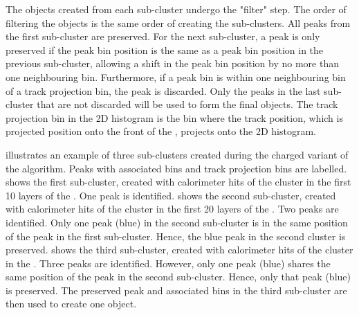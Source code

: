 The \ShowerPeak objects created from each sub-cluster undergo the "\ShowerPeak filter" step. The order of filtering the \ShowerPeak objects is the same order of creating the sub-clusters. All peaks from the first sub-cluster are preserved. For the next sub-cluster, a peak  is only preserved if the peak bin position is the same as a peak bin position in the previous sub-cluster, allowing a shift in the peak bin position by no more than one neighbouring bin. Furthermore, if a peak bin is within one neighbouring bin of a track projection bin, the peak is discarded. Only the peaks in the last sub-cluster that are not discarded will be used to form the final \ShowerPeak objects. The track projection bin in the 2D histogram is the bin where the track position, which is projected position onto the front of the \ECAL, projects onto the 2D histogram.




 illustrates an example of three sub-clusters created during the charged variant of the \peakFinding algorithm. Peaks with associated bins and track projection bins are labelled.  shows the first sub-cluster, created with calorimeter hits of the cluster in the first 10 layers of the \ECAL. One peak is identified.  shows the second sub-cluster, created with calorimeter hits of the cluster in the first 20 layers of the \ECAL. Two peaks are identified. Only one peak (blue) in the second sub-cluster is in the same position of the peak in the first sub-cluster. Hence, the blue peak in the second cluster is preserved.  shows the third sub-cluster, created with calorimeter hits of the cluster in the \ECAL. Three peaks are identified. However, only one peak (blue) shares the  same position of the peak in the second sub-cluster. Hence, only that peak (blue) is preserved. The preserved peak and associated bins in the third sub-cluster are then used to create one \ShowerPeak object.


